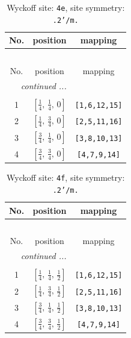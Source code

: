 \documentclass[fleqn,8pt]{jsarticle}
\begin{document}
\renewcommand{\arraystretch}{1.2}
\begin{longtable}{ccc}
\caption{Wyckoff site: {\tt 4e}, site symmetry: {\tt .2'/m.}}
 \\
 \hline \hline
No. & position & mapping \\ \hline \endfirsthead

\multicolumn{2}{l}{\tablename\ \thetable{}} \\
 \hline \hline
No. & position & mapping \\ \hline \endhead

 \hline \hline
\multicolumn{2}{r}{\footnotesize\it continued ...} \\ \endfoot

 \hline \hline
\multicolumn{2}{r}{} \\ \endlastfoot

1 & $\left[ \frac{1}{4},\, \frac{1}{4},\, 0 \right]$ & {\tt [1,6,12,15]} \\ \hline
2 & $\left[ \frac{1}{4},\, \frac{3}{4},\, 0 \right]$ & {\tt [2,5,11,16]} \\ \hline
3 & $\left[ \frac{3}{4},\, \frac{1}{4},\, 0 \right]$ & {\tt [3,8,10,13]} \\ \hline
4 & $\left[ \frac{3}{4},\, \frac{3}{4},\, 0 \right]$ & {\tt [4,7,9,14]} \\
\end{longtable}
\renewcommand{\arraystretch}{1.2}
\begin{longtable}{ccc}
\caption{Wyckoff site: {\tt 4f}, site symmetry: {\tt .2'/m.}}
 \\
 \hline \hline
No. & position & mapping \\ \hline \endfirsthead

\multicolumn{2}{l}{\tablename\ \thetable{}} \\
 \hline \hline
No. & position & mapping \\ \hline \endhead

 \hline \hline
\multicolumn{2}{r}{\footnotesize\it continued ...} \\ \endfoot

 \hline \hline
\multicolumn{2}{r}{} \\ \endlastfoot

1 & $\left[ \frac{1}{4},\, \frac{1}{4},\, \frac{1}{2} \right]$ & {\tt [1,6,12,15]} \\ \hline
2 & $\left[ \frac{1}{4},\, \frac{3}{4},\, \frac{1}{2} \right]$ & {\tt [2,5,11,16]} \\ \hline
3 & $\left[ \frac{3}{4},\, \frac{1}{4},\, \frac{1}{2} \right]$ & {\tt [3,8,10,13]} \\ \hline
4 & $\left[ \frac{3}{4},\, \frac{3}{4},\, \frac{1}{2} \right]$ & {\tt [4,7,9,14]} \\
\end{longtable}
\end{document}
